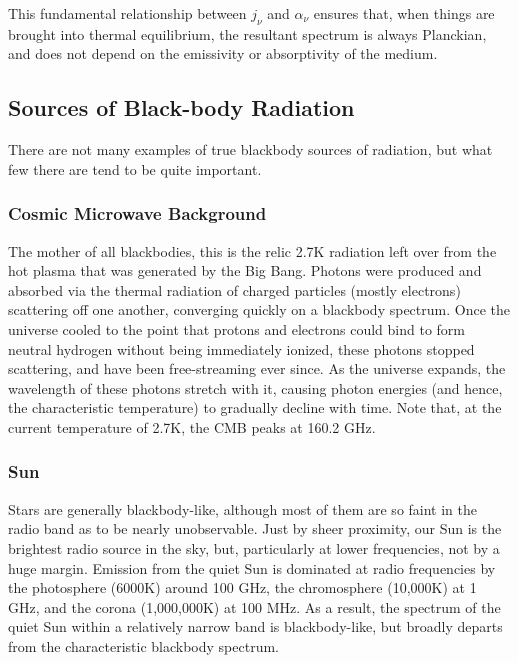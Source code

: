 \documentclass{article}
\begin{document}
This fundamental relationship between $j_\nu$ and $\alpha_\nu$ ensures that, when things are brought into thermal equilibrium, the resultant
spectrum is always Planckian, and does not depend on the emissivity or absorptivity of the medium.

\subsection{Sources of Black-body Radiation}

There are not many examples of true blackbody sources of radiation, but what few there are tend to be quite important.

\subsubsection{Cosmic Microwave Background}

The mother of all blackbodies, this is the relic 2.7K radiation left over from the hot plasma that was generated by the Big Bang.  Photons were produced and absorbed via the thermal radiation of charged particles (mostly electrons) scattering off one another, converging quickly on a blackbody spectrum.  Once the universe cooled to the point that protons and electrons could bind to form neutral hydrogen without being immediately ionized, these photons stopped scattering, and have been free-streaming ever since.  As the universe expands, the wavelength of these photons stretch with it, causing photon energies (and hence, the characteristic temperature) to gradually decline with time.  Note that, at the current temperature of 2.7K, the CMB peaks at 160.2 GHz.

\subsubsection{Sun}

Stars are generally blackbody-like, although most of them are so faint in the radio band as to be nearly unobservable.  Just by sheer proximity, our Sun is the brightest radio source in the sky, but, particularly at lower frequencies, not by a huge margin. Emission from the quiet Sun is dominated at radio frequencies by the photosphere (6000K) around 100 GHz, the chromosphere (10,000K) at 1 GHz, and the  corona (1,000,000K) at 100 MHz.  As a result, the spectrum of the quiet Sun within a relatively narrow band is blackbody-like, but broadly departs from the characteristic blackbody spectrum.
\end{document}
